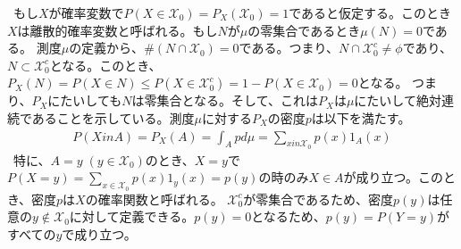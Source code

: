 \documentclass[a4j,12pt]{jarticle}
\begin{document}
\ もし$X$が確率変数で$P(X \in \mathcal{X}_{0}) = P_{X}(\mathcal{X}_{0}) = 1$であると仮定する。このとき$X$は離散的確率変数と呼ばれる。もし$N$が$\mu$の零集合であるとき$\mu(N) = 0$である。
測度$\mu$の定義から、$\#(N \cap \mathcal{X}_{0}) = 0$である。つまり、$N \cap \mathcal{X}_{0}^{c} \neq \phi$であり、$N \subset \mathcal{X}_{0}^{c}$となる。このとき、$P_{X}(N) = P(X \in N) \leq P(X \in \mathcal{X}_{0}^{c}) = 1- P(X \in \mathcal{X}_{0})=0$となる。
つまり、$P_{X}$にたいしても$N$は零集合となる。そして、これは$P_{X}$は$\mu$にたいして絶対連続であることを示している。測度$\mu$に対する$P_{X}$の密度$p$は以下を満たす。
\begin{align*}
P(X in A) = P_{X}(A) = \int_{A}p d\mu = \sum_{x in \mathcal{X}_{0}}p(x)1_{A}(x)
\end{align*}
\ 特に、$A = {y}\; (y \in \mathcal{X}_{0})$のとき、$X = y$で$P(X = y) = \sum_{x \in \mathcal{X}_{0}}p(x)1_{y}(x)=p(y)$の時のみ$X \in A$が成り立つ。このとき、密度$p$は$X$の確率関数と呼ばれる。
$\mathcal{X}_{0}^c$が零集合であるため、密度$p(y)$は任意の$y \notin \mathcal{X}_{0}$に対して定義できる。$p(y)=0$となるため、$p(y) = P(Y = y)$がすべての$y$で成り立つ。
\end{document}
